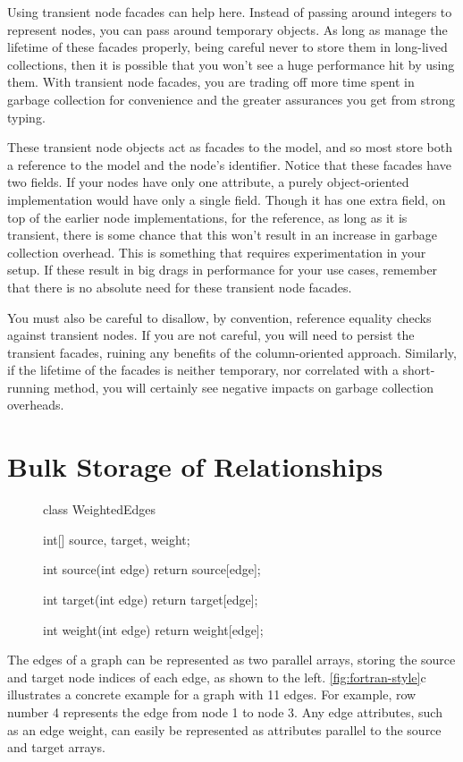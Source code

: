 Using transient node facades can help here. Instead of passing around integers
to represent nodes, you can pass around temporary  objects. As long
as manage the lifetime of these facades properly, being careful never to store
them in long-lived collections, then it is possible that you won't see a huge
performance hit by using them. With transient node facades, you are trading off
more time spent in garbage collection for convenience and the greater assurances
you get from strong typing. 

These transient node objects act as facades to the  model, and so
most store both a reference to the  model and the node's
identifier. Notice that these facades have two fields. If your nodes have only
one attribute, a purely object-oriented implementation would have only a single
field. Though it has one extra field, on top of the earlier node
implementations, for the  reference, as long as it is transient,
there is some chance that this won't result in an increase in garbage collection
overhead. This is something that requires experimentation in your setup. If
these result in big drags in performance for your use cases, remember that there
is no absolute need for these transient node facades.

You must also be careful to disallow, by convention, reference equality
checks against transient nodes. If you are not careful, you will need to persist
the transient facades, ruining any benefits of the column-oriented approach.
Similarly, if the lifetime of the facades is neither temporary, nor correlated
with a short-running method, you will certainly see negative impacts on garbage
collection overheads.

\section{Bulk Storage of Relationships}

\begin{figure}
\centering
\vspace{-3mm}
\begin{framedlisting}
class WeightedEdges {
  int[] source, target, weight;
  
  int source(int edge) {
    return source[edge];
  }
  
  int target(int edge) {
    return target[edge];
  }
  
  int weight(int edge) {
    return weight[edge];
  }
}
\end{framedlisting}
\end{figure}The edges of a graph can be represented as two parallel arrays, storing the
source and target node indices of each edge, as shown to the left.  
\autoref{fig:fortran-style}c illustrates a concrete example for a graph with 11
edges. For example, row number 4 represents the edge from node 1
to node 3. Any edge attributes, such as an edge weight, can easily be
represented as attributes parallel to the source and target arrays. 

